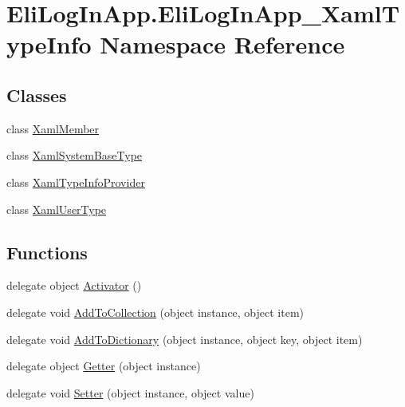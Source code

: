 \hypertarget{namespace_eli_log_in_app_1_1_eli_log_in_app___xaml_type_info}{}\section{Eli\+Log\+In\+App.\+Eli\+Log\+In\+App\+\_\+\+Xaml\+Type\+Info Namespace Reference}
\label{namespace_eli_log_in_app_1_1_eli_log_in_app___xaml_type_info}
\subsection*{Classes}
\begin{DoxyCompactItemize}
\item 
class \hyperlink{class_eli_log_in_app_1_1_eli_log_in_app___xaml_type_info_1_1_xaml_member}{Xaml\+Member}
\item 
class \hyperlink{class_eli_log_in_app_1_1_eli_log_in_app___xaml_type_info_1_1_xaml_system_base_type}{Xaml\+System\+Base\+Type}
\item 
class \hyperlink{class_eli_log_in_app_1_1_eli_log_in_app___xaml_type_info_1_1_xaml_type_info_provider}{Xaml\+Type\+Info\+Provider}
\item 
class \hyperlink{class_eli_log_in_app_1_1_eli_log_in_app___xaml_type_info_1_1_xaml_user_type}{Xaml\+User\+Type}
\end{DoxyCompactItemize}
\subsection*{Functions}
\begin{DoxyCompactItemize}
\item 
delegate object \hyperlink{namespace_eli_log_in_app_1_1_eli_log_in_app___xaml_type_info_aac7dae000d05db6a8687bf591fadc458}{Activator} ()
\item 
delegate void \hyperlink{namespace_eli_log_in_app_1_1_eli_log_in_app___xaml_type_info_ae065c6471eb08de467f9dcf77418eceb}{Add\+To\+Collection} (object instance, object item)
\item 
delegate void \hyperlink{namespace_eli_log_in_app_1_1_eli_log_in_app___xaml_type_info_a2190230291cdc4abb09b6c76730fd8b2}{Add\+To\+Dictionary} (object instance, object key, object item)
\item 
delegate object \hyperlink{namespace_eli_log_in_app_1_1_eli_log_in_app___xaml_type_info_a2e50981165e4a32bee0650acaaae4e51}{Getter} (object instance)
\item 
delegate void \hyperlink{namespace_eli_log_in_app_1_1_eli_log_in_app___xaml_type_info_ac0b421806ab2435b714a48e3f4062def}{Setter} (object instance, object value)
\end{DoxyCompactItemize}



